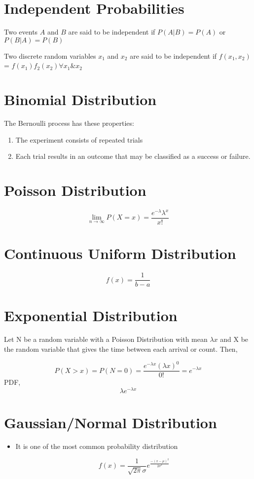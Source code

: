 \documentclass[11pt]{report}
\begin{document}
\section{Independent Probabilities}
\label{sec:org44b59e9}

Two events \(A\) and \(B\) are said to be independent if \(P(A|B) = P(A)\) or \(P(B|A) = P(B)\)

Two discrete random variables \(x_1\) and \(x_2\) are said to be independent if \(f(x_1,x_2)\) = \(f(x_1)f_2(x_2) \forall x_1 \& x_2\)
\section{Binomial Distribution}
\label{sec:org394c5ce}
The Bernoulli process has these properties:
\begin{enumerate}
\item The experiment consists of repeated trials
\item Each trial results in an outcome that may be classified as a success or failure.
\end{enumerate}
\section{Poisson Distribution}
\label{sec:org12e322a}
$$\lim_{n \rightarrow \infty} P(X=x) = \frac{e^{-\lambda}\lambda^x}{x!}$$
\section{Continuous Uniform Distribution}
\label{sec:org0c516dc}
$$f(x) = \frac{1}{b-a}$$
\section{Exponential Distribution}
\label{sec:orgd733d12}
Let N be a random variable with a Poisson Distribution with mean \(\lambda x\) and X be the random variable that gives the time between each arrival or count. Then,


$$P(X > x) = P(N=0) = \frac{e^{-\lambda x}(\lambda x)^0}{0!} = e^{-\lambda x}$$
PDF,
$$\lambda e^{-\lambda x}$$
\section{Gaussian/Normal Distribution}
\label{sec:orgd01d597}
\begin{itemize}
\item It is one of the most common probability distribution

$$f(x) = \frac{1}{\sqrt{2 \pi} \sigma} e^{\frac{-(x-\mu)^2}{2 \sigma^2}}$$
\end{itemize}
\end{document}
